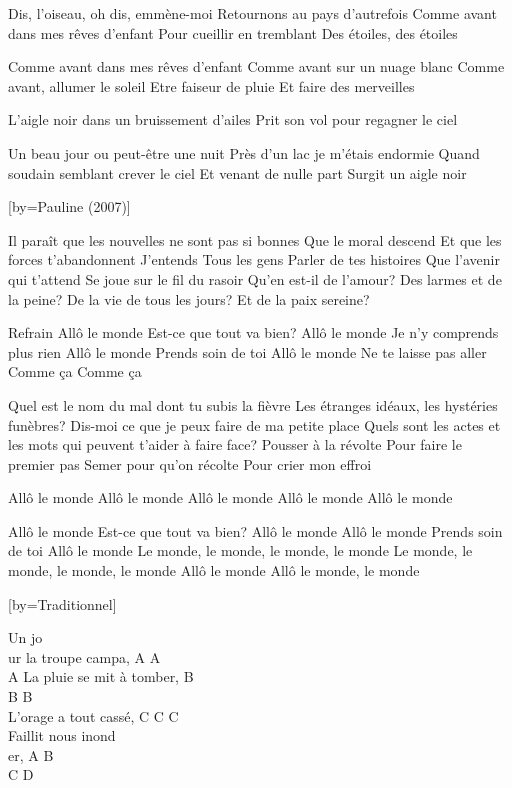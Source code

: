 \beginverse
Dis, l'oiseau, oh dis, emmène-moi
Retournons au pays d'autrefois
Comme avant dans mes rêves d'enfant
Pour cueillir en tremblant 
Des étoiles, des étoiles 
\endverse

\beginverse
Comme avant dans mes rêves d'enfant
Comme avant sur un nuage blanc 
Comme avant, allumer le soleil
Etre faiseur de pluie 
Et faire des merveilles
\endverse

\beginverse
L'aigle noir dans un bruissement d'ailes
Prit son vol pour regagner le ciel
\endverse

\beginverse
Un beau jour ou peut-être une nuit
Près d'un lac je m'étais endormie
Quand soudain semblant crever le ciel 
Et venant de nulle part
Surgit un aigle noir
\endverse

[by={Pauline (2007)}]

\beginverse
Il paraît que les nouvelles ne sont pas si bonnes
Que le moral descend
Et que les forces t'abandonnent
J'entends
Tous les gens
Parler de tes histoires
Que l'avenir qui t'attend
Se joue sur le fil du rasoir
Qu'en est-il de l'amour?
Des larmes et de la peine?
De la vie de tous les jours?
Et de la paix sereine?
\endverse

\beginverse
Refrain
Allô le monde
Est-ce que tout va bien?
Allô le monde
Je n'y comprends plus rien
Allô le monde
Prends soin de toi
Allô le monde
Ne te laisse pas aller
Comme ça
Comme ça
\endverse

\beginverse
Quel est le nom du mal dont tu subis la fièvre
Les étranges idéaux, les hystéries funèbres?
Dis-moi ce que je peux faire de ma petite place
Quels sont les actes et les mots qui peuvent t'aider à faire face?
Pousser à la révolte
Pour faire le premier pas
Semer pour qu'on récolte
Pour crier mon effroi
\endverse

\beginverse
Allô le monde
Allô le monde
Allô le monde
Allô le monde
Allô le monde
\endverse

\beginverse
Allô le monde
Est-ce que tout va bien?
Allô le monde
Allô le monde
Prends soin de toi
Allô le monde
Le monde, le monde, le monde, le monde
Le monde, le monde, le monde, le monde
Allô le monde
Allô le monde, le monde
\endverse

[by={Traditionnel}]

\beginverse
Un jo\\[Do]ur la troupe campa, A A\\[Sol] A 
La pluie se mit à tomber, B\\[Sol7] B B\\[Do]
L'orage a tout cassé, C C C\\[Sol] 
Faillit nous inond\\[Do]er, A B\\[Sol] C D\\[Do] 
\endverse

